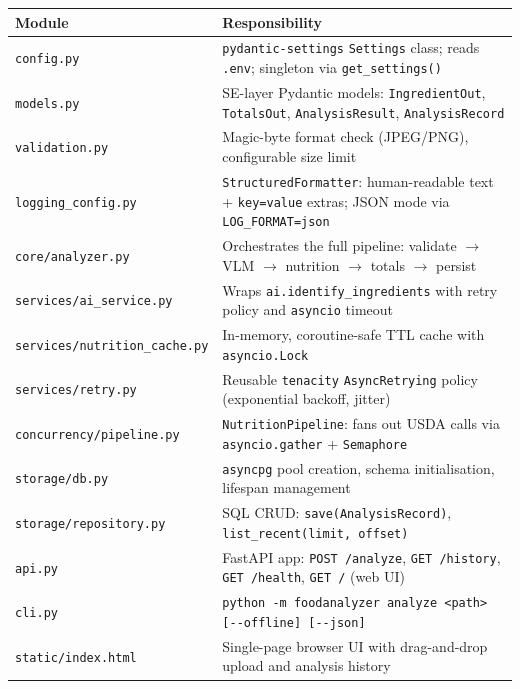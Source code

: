 \documentclass[11pt,a4paper]{article}
\begin{document}
\begin{center}\small
\begin{tabularx}{\textwidth}{@{} l X @{}}
\toprule
\textbf{Module} & \textbf{Responsibility} \\
\midrule
\texttt{config.py}                  & \texttt{pydantic-settings} \texttt{Settings} class; reads \texttt{.env}; singleton via \texttt{get\_settings()} \\
\texttt{models.py}                  & SE-layer Pydantic models: \texttt{IngredientOut}, \texttt{TotalsOut}, \texttt{AnalysisResult}, \texttt{AnalysisRecord} \\
\texttt{validation.py}              & Magic-byte format check (JPEG/PNG), configurable size limit \\
\texttt{logging\_config.py}         & \texttt{StructuredFormatter}: human-readable text + \texttt{key=value} extras; JSON mode via \texttt{LOG\_FORMAT=json} \\
\texttt{core/analyzer.py}           & Orchestrates the full pipeline: validate $\to$ VLM $\to$ nutrition $\to$ totals $\to$ persist \\
\texttt{services/ai\_service.py}    & Wraps \texttt{ai.identify\_ingredients} with retry policy and \texttt{asyncio} timeout \\
\texttt{services/nutrition\_cache.py} & In-memory, coroutine-safe TTL cache with \texttt{asyncio.Lock} \\
\texttt{services/retry.py}          & Reusable \texttt{tenacity} \texttt{AsyncRetrying} policy (exponential backoff, jitter) \\
\texttt{concurrency/pipeline.py}    & \texttt{NutritionPipeline}: fans out USDA calls via \texttt{asyncio.gather} + \texttt{Semaphore} \\
\texttt{storage/db.py}              & \texttt{asyncpg} pool creation, schema initialisation, lifespan management \\
\texttt{storage/repository.py}      & SQL CRUD: \texttt{save(AnalysisRecord)}, \texttt{list\_recent(limit, offset)} \\
\texttt{api.py}                     & FastAPI app: \texttt{POST /analyze}, \texttt{GET /history}, \texttt{GET /health}, \texttt{GET /} (web UI) \\
\texttt{cli.py}                     & \texttt{python -m foodanalyzer analyze <path> [{-}{-}offline] [{-}{-}json]} \\
\texttt{static/index.html}          & Single-page browser UI with drag-and-drop upload and analysis history \\
\bottomrule
\end{tabularx}
\end{center}
\end{document}
